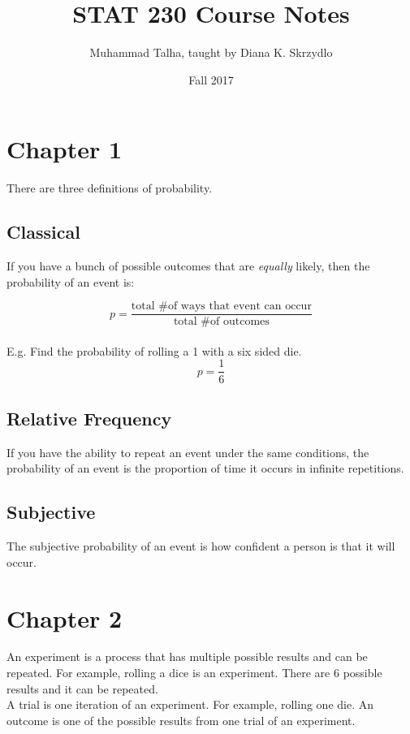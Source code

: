 \documentclass[12pt, letterpaper]{article}
\begin{document}
\title{STAT 230 Course Notes}
\author{Muhammad Talha, taught by Diana K. Skrzydlo }
\date{Fall 2017}

\maketitle

\tableofcontents

\newpage

\section{Chapter 1}
There are three definitions of probability.

\subsection{Classical}
If you have a bunch of possible outcomes that are \emph{equally} likely, then the probability
of an event is:

\[
 p = \frac{\text{total \# of ways that event can occur}}{\text{total \# of outcomes}}
\] \\

E.g. Find the probability of rolling a 1 with a six sided die. 
\[
p = \frac{1}{6}
\]

\subsection{Relative Frequency}
If you have the ability to repeat an event under the same conditions, the probability of an
event is the proportion of time it occurs in infinite repetitions.

\subsection{Subjective}
The subjective probability of an event is how confident a person is that it will occur.

\newpage

\section{Chapter 2}
An experiment is a process that has multiple possible results and can be repeated.
For example, rolling a dice is an experiment. There are 6 possible results and it can be repeated.\\

A trial is one iteration of an experiment. For example, rolling one die.
An outcome is one of the possible results from one trial of an experiment.\\
\end{document}

